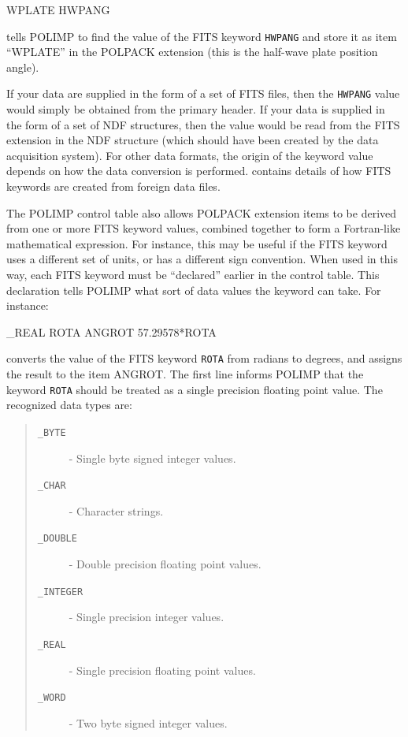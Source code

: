 \documentclass[twoside,11pt]{starlink}
\begin{document}
\begin{terminalv}
WPLATE HWPANG
\end{terminalv}

tells POLIMP to find the value of the FITS keyword \verb+HWPANG+ and
store it as item ``WPLATE'' in the POLPACK extension (this is the
half-wave plate position angle).

If your data are supplied in the form of a set of FITS files, then the
\verb+HWPANG+ value would simply be obtained from the primary header. If your
data is supplied in the form of a set of NDF structures, then the value
would be read from the FITS extension in the NDF structure (which should
have been created by the data acquisition system). For other data formats,
the origin of the keyword value depends on how the data conversion is
performed.  contains details of how FITS keywords
are created from foreign data files.

The POLIMP control table also allows POLPACK extension items to be
derived from one or more FITS keyword values, combined together to form a
Fortran-like mathematical expression. For instance, this may be useful if
the FITS keyword uses a different set of units, or has a different sign
convention. When used in this way, each FITS keyword must be ``declared''
earlier in the control table. This declaration tells POLIMP what sort of
data values the keyword can take. For instance:

\begin{terminalv}
_REAL  ROTA
ANGROT 57.29578*ROTA
\end{terminalv}

converts the value of the FITS keyword \verb+ROTA+ from radians to
degrees, and assigns the result to the item ANGROT.
The first line informs POLIMP that the keyword \verb+ROTA+ should be
treated as a single precision floating point value. The recognized data
types are:

\begin{quote}
\begin{description}
\item[\texttt{\_BYTE}]		- Single byte signed integer values.
\item[\texttt{\_CHAR}]		- Character strings.
\item[\texttt{\_DOUBLE}]       	- Double precision floating point values.
\item[\texttt{\_INTEGER}]	- Single precision integer values.
\item[\texttt{\_REAL}]		- Single precision floating point values.
\item[\texttt{\_WORD}]		- Two byte signed integer values.
\end{description}
\end{quote}
\end{document}
